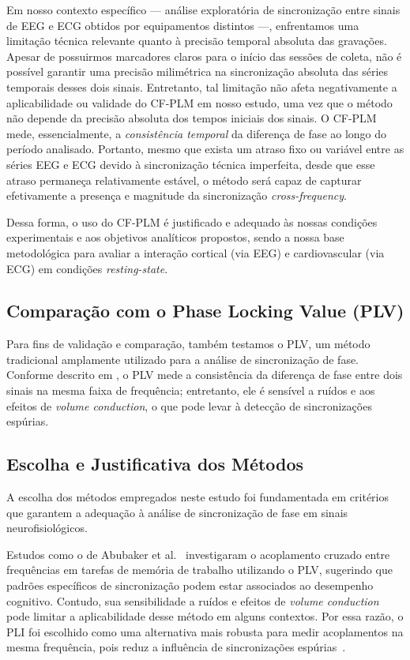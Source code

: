 Em nosso contexto específico — análise exploratória de sincronização entre sinais de EEG e ECG obtidos por equipamentos distintos —, enfrentamos uma limitação técnica relevante quanto à precisão temporal absoluta das gravações. Apesar de possuirmos marcadores claros para o início das sessões de coleta, não é possível garantir uma precisão milimétrica na sincronização absoluta das séries temporais desses dois sinais. Entretanto, tal limitação não afeta negativamente a aplicabilidade ou validade do CF-PLM em nosso estudo, uma vez que o método não depende da precisão absoluta dos tempos iniciais dos sinais. O CF-PLM mede, essencialmente, a \textit{consistência temporal} da diferença de fase ao longo do período analisado. Portanto, mesmo que exista um atraso fixo ou variável entre as séries EEG e ECG devido à sincronização técnica imperfeita, desde que esse atraso permaneça relativamente estável, o método será capaz de capturar efetivamente a presença e magnitude da sincronização \textit{cross-frequency}.

Dessa forma, o uso do CF-PLM é justificado e adequado às nossas condições experimentais e aos objetivos analíticos propostos, sendo a nossa base metodológica para avaliar a interação cortical (via EEG) e cardiovascular (via ECG) em condições \textit{resting-state}.


\subsection{Comparação com o Phase Locking Value (PLV)}

Para fins de validação e comparação, também testamos o PLV, um método tradicional amplamente utilizado para a análise de sincronização de fase. Conforme descrito em \cite{seraj2018cerebral}, o PLV mede a consistência da diferença de fase entre dois sinais na mesma faixa de frequência; entretanto, ele é sensível a ruídos e aos efeitos de \textit{volume conduction}, o que pode levar à detecção de sincronizações espúrias.

\subsection{Escolha e Justificativa dos Métodos}

A escolha dos métodos empregados neste estudo foi fundamentada em critérios que garantem a adequação à análise de sincronização de fase em sinais neurofisiológicos.

Estudos como o de Abubaker et al.~\cite{abubaker2021working} investigaram o acoplamento cruzado entre frequências em tarefas de memória de trabalho utilizando o PLV, sugerindo que padrões específicos de sincronização podem estar associados ao desempenho cognitivo. Contudo, sua sensibilidade a ruídos e efeitos de \textit{volume conduction} pode limitar a aplicabilidade desse método em alguns contextos. Por essa razão, o PLI foi escolhido como uma alternativa mais robusta para medir acoplamentos na mesma frequência, pois reduz a influência de sincronizações espúrias~\cite{seraj2018cerebral, zhang2014phase}.

